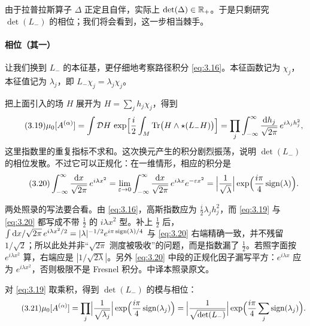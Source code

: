 由于拉普拉斯算子 $\Delta$ 正定且自伴，实际上 $\det(\Delta)\in\mathbb{R}_+$。于是只剩研究 $\det(L_-)$ 的相位；我们将会看到，这一步相当棘手。

\paragraph{相位（其一）}
让我们换到 $L_-$ 的本征基，更仔细地考察路径积分 \eqref{eq:3.16}。本征函数记为 $\chi_j$，本征值记为 $\lambda_j$，即 $L_-\chi_j=\lambda_j\chi_j$。

把上面引入的场 $H$ 展开为 $H=\sum_j h_j\chi_j$，得到
\begin{equation}\tag{3.19}\label{eq:3.19}
  \mu_0[A^{(\alpha)}] = \int\mathcal{D}H\,\exp\Bigl[\frac{i}{2}\int_M\operatorname{Tr}\bigl(H\wedge\star(L_-H)\bigr)\Bigr]
  = \prod_j\int_{-\infty}^{\infty}\frac{\mathrm{d} h_j}{\sqrt{2\pi}}\,e^{i\lambda_jh_j^2},
\end{equation}
这里指数里的重复指标不求和。这次换元产生的积分剧烈振荡，说明 $\det(L_-)$ 的相位发散。不过它可以正规化：在一维情形，相应的积分是
\begin{equation}\tag{3.20}\label{eq:3.20}
  \int_{-\infty}^{\infty}\frac{\mathrm{d} x}{\sqrt{2\pi}}\,e^{i\lambda x^2}
  = \lim_{\varepsilon\to0}\int_{-\infty}^{\infty}\frac{\mathrm{d} x}{\sqrt{2\pi}}\,e^{i\lambda x}e^{-\varepsilon x^2}
  = \Bigl|\frac{1}{\sqrt{\lambda}}\Bigr|\exp\Bigl(\frac{i\pi}{4}\operatorname{sign}(\lambda)\Bigr).
\end{equation}

\begin{yizhu}[原文疑误]
两处照录的写法要合看。由 \eqref{eq:3.16}，高斯指数应为 $\frac i2\lambda_jh_j^2$，而 \eqref{eq:3.19} 与 \eqref{eq:3.20} 都写成不带 $\frac12$ 的 $i\lambda x^2$ 型。补上 $\frac12$ 后，$\int\mathrm{d} x/\sqrt{2\pi}\,e^{i\lambda x^2/2}=|\lambda|^{-1/2}e^{i\pi\operatorname{sign}(\lambda)/4}$ 与 \eqref{eq:3.20} 右端精确一致，并不残留 $1/\sqrt2$；所以此处并非“$\sqrt{2\pi}$ 测度被吸收”的问题，而是指数漏了 $\frac12$。若照字面按 $e^{i\lambda x^2}$ 算，右端应是 $|1/\sqrt{2\lambda}|$。另外 \eqref{eq:3.20} 中段的正规化因子漏写平方：$e^{i\lambda x}$ 应为 $e^{i\lambda x^2}$，否则极限不是 Fresnel 积分。中译本照录原文。
\end{yizhu}

对 \eqref{eq:3.19} 取乘积，得到 $\det(L_-)$ 的模与相位：
\begin{equation}\tag{3.21}\label{eq:3.21}
  \mu_0[A^{(\alpha)}] = \prod_j\Bigl|\frac{1}{\sqrt{\lambda_j}}\Bigr|\exp\Bigl(\frac{i\pi}{4}\operatorname{sign}(\lambda_j)\Bigr)
  = \Bigl|\frac{1}{\sqrt{\det(L_-)}}\Bigr|\exp\Bigl(\frac{i\pi}{4}\sum_j\operatorname{sign}(\lambda_j)\Bigr).
\end{equation}

